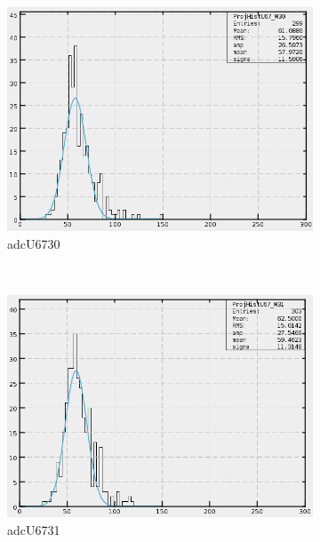 \begin{figure}[h]
\begin{subfigure}[h]{0.3\textwidth}
        \includegraphics[width=\textwidth, keepaspectratio = true]{adcU67_30}
        \caption{adcU6730}
        \label{fig:adcU67_30}
    \end{subfigure}
    ~
    \begin{subfigure}[h]{0.3\textwidth}
        \centering
        \includegraphics[width=\textwidth, keepaspectratio = true]{adcU67_31}
        \caption{adcU6731}
        \label{fig:adcU67_31}
    \end{subfigure}
    \\
    \begin{subfigure}[h]{0.3\textwidth}
        \centering

\end{subfigure}
\end{figure}

